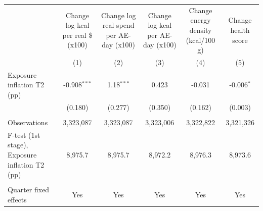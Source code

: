 \begingroup
\centering
\begin{tabular*}{\textwidth}{@{\extracolsep{\fill}}lccccc}
   \toprule
                                                  & Change log kcal per real \$ (x100)  & Change log real spend per AE-day (x100) & Change log kcal per AE-day (x100) & Change energy density (kcal/100 g) & Change health score\\  
                                                  & (1)                                 & (2)                                     & (3)                               & (4)                                & (5)\\  
   \midrule 
   Exposure inflation T2 (pp)                     & -0.908$^{***}$                      & 1.18$^{***}$                            & 0.423                             & -0.031                             & -0.006$^{*}$\\   
                                                  & (0.180)                             & (0.277)                                 & (0.350)                           & (0.162)                            & (0.003)\\   
    \\
   Observations                                   & 3,323,087                           & 3,323,087                               & 3,323,006                         & 3,322,822                          & 3,321,326\\  
   F-test (1st stage), Exposure inflation T2 (pp) & 8,975.7                             & 8,975.7                                 & 8,972.2                           & 8,976.3                            & 8,973.6\\  
    \\
   Quarter fixed effects                          & Yes                                 & Yes                                     & Yes                               & Yes                                & Yes\\  
   \bottomrule
\end{tabular*}
\par\endgroup
